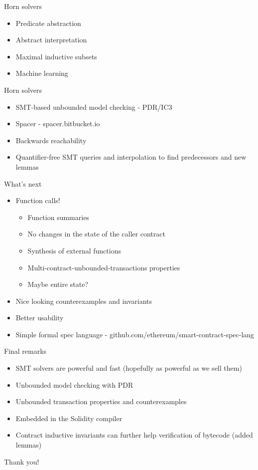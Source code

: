 \documentclass[aspectratio=169,10pt]{beamer}
\begin{document}
\begin{frame}{Horn solvers}
\begin{itemize}
	\item Predicate abstraction
	\item Abstract interpretation
	\item Maximal inductive subsets
	\item Machine learning
\end{itemize}
\end{frame}

\begin{frame}{Horn solvers}
\begin{itemize}
	\item SMT-based unbounded model checking - PDR/IC3
	\item Spacer - spacer.bitbucket.io
	\item Backwards reachability
	\item Quantifier-free SMT queries and interpolation to find predecessors and new lemmas
\end{itemize}
\end{frame}

\begin{frame}{What's next}
\begin{itemize}
	\item Function calls!
	\begin{itemize}
		\item Function summaries
		\item No changes in the state of the caller contract
		\item Synthesis of external functions
		\item Multi-contract-unbounded-transactions properties
		\item Maybe entire state?
	\end{itemize}
	\item Nice looking counterexamples and invariants
	\item Better usability
	\item Simple formal spec language - github.com/ethereum/smart-contract-spec-lang
\end{itemize}
\end{frame}

\begin{frame}{Final remarks}
\begin{itemize}
	\item SMT solvers are powerful and fast (hopefully as powerful as we sell them)
	\item Unbounded model checking with PDR
	\item Unbounded transaction properties and counterexamples
	\item Embedded in the Solidity compiler
	\item Contract inductive invariants can further help verification of bytecode (added lemmas)
\end{itemize}
\end{frame}

\begin{frame}
\begin{center}
Thank you!
\end{center}
\end{frame}
 
\end{document}
